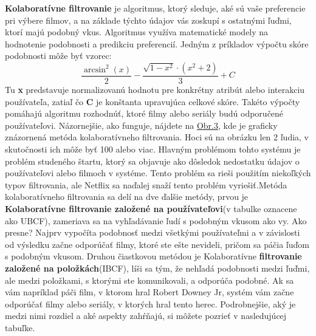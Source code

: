 \documentclass[10pt,slovak,a4paper]{article}
\begin{document}
\textbf{Kolaboratívne filtrovanie} je algoritmus, ktorý sleduje, aké sú vaše preferencie pri výbere filmov, a na základe týchto údajov vás zoskupí s ostatnými ľuďmi, ktorí majú podobný vkus. Algoritmus využíva matematické modely na hodnotenie podobnosti a predikciu preferencií. Jedným z príkladov výpočtu skóre podobnosti môže byť vzorec: 
\[
\frac{\arcsin^2(x)}{2} - \frac{\sqrt{1 - x^2} \cdot (x^2 + 2)}{3} + C
\]
Tu \textbf{x} predstavuje normalizovanú hodnotu pre konkrétny atribút alebo interakciu používateľa, zatiaľ čo \textbf{C} je konštanta upravujúca celkové skóre. Takéto výpočty pomáhajú algoritmu rozhodnúť, ktoré filmy alebo seriály budú odporučené používateľovi. Názornejšie, ako funguje, nájdete na \hyperref[Types:of:filtering]{Obr.3}, kde je graficky znázornená metóda kolaboratívneho filtrovania. Hoci sú na obrázku len 2 ľudia, v skutočnosti ich môže byť 100 alebo viac.\cite{Coll:fil} Hlavným problémom tohto systému je problém studeného štartu, ktorý sa objavuje ako dôsledok nedostatku údajov o používateľovi alebo filmoch v systéme. Tento problém sa rieši použitím niekoľkých typov filtrovania, ale Netflix sa naďalej snaží tento problém vyriešiť.Metóda kolaboratívneho filtrovania sa delí na dve ďalšie metódy, prvou je \textbf{Kolaboratívne filtrovanie založené na používateľovi}(v tabulke oznacene ako UBCF), zameriava sa na vyhľadávanie ľudí s podobným vkusom ako vy.\cite{Fil:alg:colab} Ako presne? Najprv vypočíta podobnosť medzi všetkými používateľmi a v závislosti od výsledku začne odporúčať filmy, ktoré ste ešte nevideli, pričom sa páčia ľuďom s podobným vkusom.
Druhou čiastkovou metódou je Kolaboratívne \textbf{filtrovanie založené na položkách}(IBCF), líši sa tým, že nehľadá podobnosti medzi ľuďmi, ale medzi položkami, s ktorými ste komunikovali, a odporúča podobné. Ak sa vám napríklad páči film, v ktorom hral Robert Downey Jr, systém vám začne odporúčať filmy alebo seriály, v ktorých hral tento herec.
Podrobnejšie, aký je medzi nimi rozdiel a aké aspekty zahŕňajú, si môžete pozrieť v nasledujúcej tabuľke.
\end{document}
